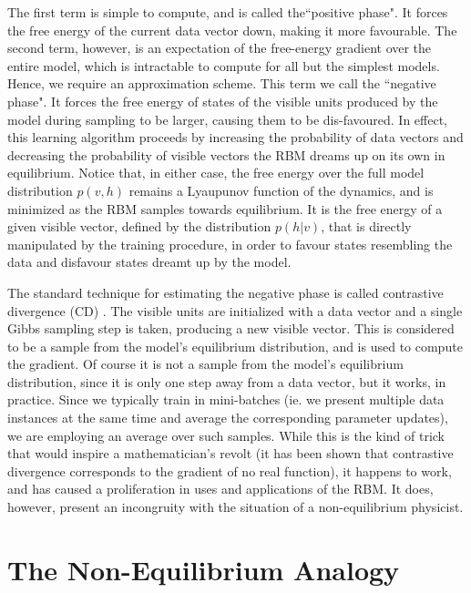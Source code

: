 \documentclass[11pt, oneside]{article}   	%
\begin{document}
The first term is simple to compute, and is called the``positive phase".  It forces the free energy of the current data vector down, making it more favourable.  The second term, however, is an expectation of the free-energy gradient over the entire model, which is intractable to compute for all but the simplest models.  Hence, we require an approximation scheme.  This term we call the ``negative phase".  It forces the free energy of states of the visible units produced by the model during sampling to be larger, causing them to be dis-favoured.  In effect, this learning algorithm proceeds by increasing the probability of data vectors and decreasing the probability of visible vectors the RBM dreams up on its own in equilibrium.  Notice that, in either case, the free energy over the full model distribution $p(v, h)$ remains a Lyaupunov function of the dynamics, and is minimized as the RBM samples towards equilibrium.  It is the free energy of a given visible vector, defined by the distribution $p(h | v)$, that is directly manipulated by the training procedure, in order to favour states resembling the data and disfavour states dreamt up by the model.

The standard technique for estimating the negative phase is called contrastive divergence (CD) \cite{CD}.  The visible units are initialized with a data vector and a single Gibbs sampling step is taken, producing a new visible vector.  This is considered to be a sample from the model's equilibrium distribution, and is used to compute the gradient.  Of course it is not a sample from the model's equilibrium distribution, since it is only one step away from a data vector, but it works, in practice.  Since we typically train in mini-batches (ie. we present multiple data instances at the same time and average the corresponding parameter updates), we are employing an average over such samples.  While this is the kind of trick that would inspire a mathematician's revolt (it has been shown that contrastive divergence corresponds to the gradient of no real function), it happens to work, and has caused a proliferation in uses and applications of the RBM.  It does, however, present an incongruity with the situation of a non-equilibrium physicist.

\section{The Non-Equilibrium Analogy}
\end{document}
